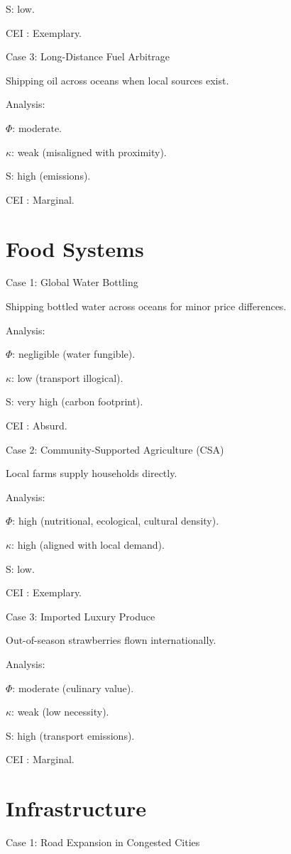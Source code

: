 \documentclass{book}
\begin{document}
S: low.

CEI : Exemplary.

Case 3: Long-Distance Fuel Arbitrage

Shipping oil across oceans when local sources exist.

Analysis:

\(\Phi\): moderate.

\(\kappa\): weak (misaligned with proximity).

S: high (emissions).

CEI : Marginal.

\section{Food Systems}

Case 1: Global Water Bottling

Shipping bottled water across oceans for minor price differences.

Analysis:

\(\Phi\): negligible (water fungible).

\(\kappa\): low (transport illogical).

S: very high (carbon footprint).

CEI : Absurd.

Case 2: Community-Supported Agriculture (CSA)

Local farms supply households directly.

Analysis:

\(\Phi\): high (nutritional, ecological, cultural density).

\(\kappa\): high (aligned with local demand).

S: low.

CEI : Exemplary.

Case 3: Imported Luxury Produce

Out-of-season strawberries flown internationally.

Analysis:

\(\Phi\): moderate (culinary value).

\(\kappa\): weak (low necessity).

S: high (transport emissions).

CEI : Marginal.

\section{Infrastructure}

Case 1: Road Expansion in Congested Cities
\end{document}
